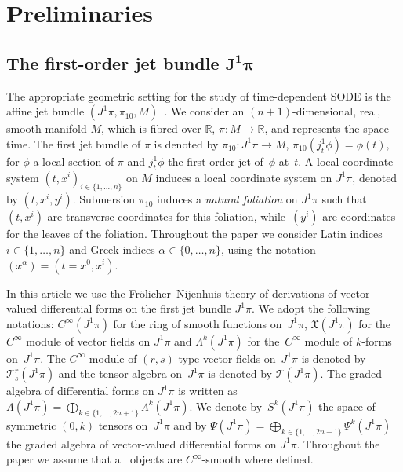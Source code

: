\section{Preliminaries} \label{sec:prelim}


\subsection[The first-order jet bundle $J^{1}\pi$]{The f\/irst-order jet bundle $\boldsymbol{J^{1}\pi}$} \label{subsec:fn}

The appropriate geometric setting for the study of time-dependent
SODE is the af\/f\/ine jet bundle $(J^{1}\pi,\pi_{10},M)$~\cite{saunders89}.
We consider an $(n+1)$-dimensional, real, smooth manifold $M$, which
is f\/ibred over $\mathbb{R}$, $\pi:M\rightarrow\mathbb{R}$, and represents
the space-time. The f\/irst jet bundle of $\pi$ is denoted by $\pi_{10}:J^{1}\pi\to M$,
$\pi_{10}(j_{t}^{1}\phi)=\phi(t),$ for $\phi$ a local section of
$\pi$ and $j_{t}^{1}\phi$ the f\/irst-order jet of~$\phi$ at~$t$.
A local coordinate system $(t,x^{i})_{i\in \{1,\dots,n\}}$ on $M$
induces a local coordinate system on $J^{1}\pi$, denoted by $(t,x^{i},y^{i})$.
Submersion $\pi_{10}$ induces a \emph{natural foliation} on $J^{1}\pi$
such that~$(t,x^{i})$ are transverse coordinates for this foliation,
while~$(y^{i})$ are coordinates for the leaves of the foliation.
Throughout the paper we consider Latin indices $i\in \{1,\dots,n\}$
and Greek indices $\alpha\in \{0,\dots,n\}$, using the notation~$\left(x^{\alpha}\right)=(t=x^{0},x^{i})$.

In this article we use the Fr\"olicher--Nijenhuis theory \cite{frolicher56,grifone00,KMS93}
of derivations of vector-valued dif\/ferential forms on the f\/irst jet
bundle $J^{1}\pi$. We adopt the following notations: $C^{\infty}(J^{1}\pi)$
for the ring of smooth functions on~$J^{1}\pi$, $\mathfrak{X}(J^{1}\pi)$
for the~$C^{\infty}$ module of vector f\/ields on $J^{1}\pi$ and $\Lambda^{k}(J^{1}\pi)$
for the~$C^{\infty}$ module of $k$-forms on~$J^{1}\pi$. The $C^{\infty}$
module of $(r,s)$-type vector f\/ields on~$J^{1}\pi$ is denoted by
$\mathcal{T}_{s}^{r}(J^{1}\pi)$ and the tensor algebra on~$J^{1}\pi$
is denoted by $\mathcal{T}(J^{1}\pi)$. The graded algebra of dif\/ferential
forms on $J^{1}\pi$ is written as $\Lambda(J^{1}\pi)=\bigoplus_{k\in \{1,\dots,2n+1\}}\Lambda^{k}(J^{1}\pi)$.
We denote by~$S^{k}(J^{1}\pi)$ the space of symmetric $(0,k)$ tensors
on~$J^{1}\pi$ and by $\Psi(J^{1}\pi)=\bigoplus_{k\in \{1,\dots,2n+1\}}\Psi^{k}(J^{1}\pi)$
the graded algebra of vector-valued dif\/ferential forms on $J^{1}\pi$.
Throughout the paper we assume that all objects are $C^{\infty}$-smooth
where def\/ined.

